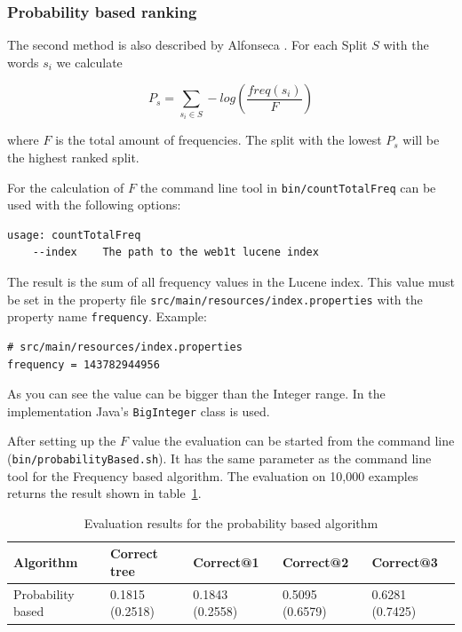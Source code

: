 \documentclass[11pt, accentcolor=tud9b, nochapname]{tudreport}
\begin{document}
\subsubsection{Probability based ranking}
The second method is also described by Alfonseca \cite{alf2008}. For each Split $S$ with the words $s_i$ we calculate

\begin{equation}
  P_s = \sum_{s_i \in S} -log(\frac{freq(s_i)}{F})
\end{equation}

where $F$ is the total amount of frequencies. The split with the lowest $P_s$ will be the highest ranked split.

For the calculation of $F$ the command line tool in \texttt{bin/countTotalFreq} can be used with the following options:

\begin{lstlisting}
usage: countTotalFreq
    --index    The path to the web1t lucene index
\end{lstlisting}

The result is the sum of all frequency values in the Lucene index. This value must be set in the property file \texttt{src/main/resources/index.properties} with the property name \texttt{frequency}. Example:

\begin{lstlisting}
# src/main/resources/index.properties
frequency = 143782944956
\end{lstlisting}

As you can see the value can be bigger than the Integer range. In the implementation Java's \texttt{BigInteger} class is used.

After setting up the $F$ value the evaluation can be started from the command line (\texttt{bin/probabilityBased.sh}). It has the same parameter as the command line tool for the Frequency based algorithm. The evaluation on 10,000 examples returns the result shown in table~\ref{eval_prob}.

\begin{table}[h]
  \begin{center}
    \begin{tabular}{|l|l||l|l|l|}
      \hline
      \textbf{Algorithm} & \textbf{Correct tree} & \textbf{Correct@1} & \textbf{Correct@2} & \textbf{Correct@3} \\ \hline
      Probability based & 0.1815  (0.2518) & 0.1843 (0.2558) & 0.5095 (0.6579) & 0.6281 (0.7425) \\ \hline
    \end{tabular}
  \end{center}
  \caption{Evaluation results for the probability based algorithm}
  \label{eval_prob}
\end{table}
\end{document}
